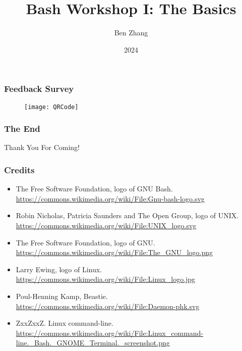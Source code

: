 \documentclass{beamer}
\title{Bash Workshop I: The Basics}
\author{Ben Zhang}
\institute{JITech}
\date{2024}
\begin{document}
\frame{\titlepage}






\begin{frame}
  \frametitle{Feedback Survey}
  \begin{figure}[h]
    \centering
    \texttt{[image: QRCode]}
  \end{figure}
\end{frame}

\begin{frame}
\frametitle{The End}
\vspace{1cm}
\centering \Huge {Thank You For Coming!}
\end{frame}

\begin{frame}
\frametitle{Credits}
\begin{itemize}
    \item The Free Software Foundation, logo of GNU Bash.
        \url{https://commons.wikimedia.org/wiki/File:Gnu-bash-logo.svg}
    \item Robin Nicholas, Patricia Saunders and The Open Group, logo of UNIX.
        \url{https://commons.wikimedia.org/wiki/File:UNIX_logo.svg}
    \item The Free Software Foundation, logo of GNU.
        \url{https://commons.wikimedia.org/wiki/File:The_GNU_logo.png}
    \item Larry Ewing, logo of Linux.
        \url{https://commons.wikimedia.org/wiki/File:Linux_logo.jpg}
    \item Poul-Henning Kamp, Beastie.
        \url{https://commons.wikimedia.org/wiki/File:Daemon-phk.svg}
    \item ZxxZxxZ. Linux command-line.
        \url{https://commons.wikimedia.org/wiki/File:Linux_command-line._Bash._GNOME_Terminal._screenshot.png}
\end{itemize}
\end{frame}
\end{document}
